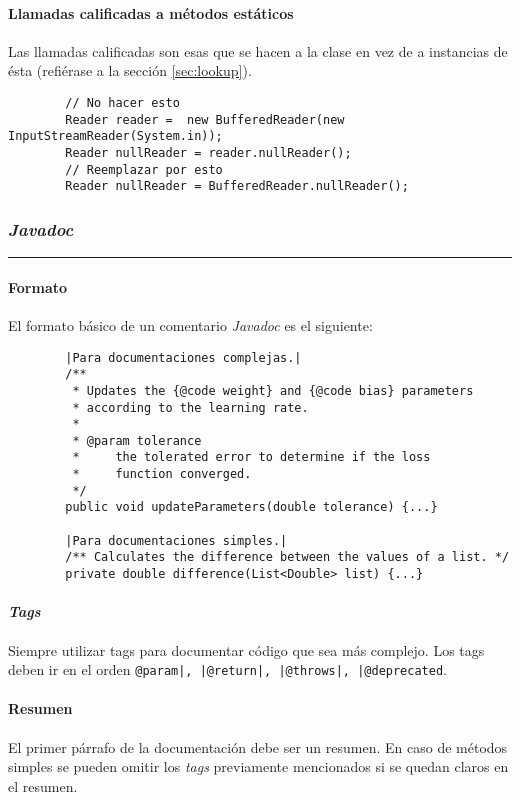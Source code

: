     \paragraph{Llamadas calificadas a métodos estáticos}
      Las llamadas calificadas son esas que se hacen a la clase en vez de a instancias de 
      ésta (refiérase a la sección \ref{sec:lookup}).

      \begin{verbatim}
        // No hacer esto
        Reader reader =  new BufferedReader(new InputStreamReader(System.in));
        Reader nullReader = reader.nullReader();
        // Reemplazar por esto
        Reader nullReader = BufferedReader.nullReader();         
      \end{verbatim}
  \subsubsection{\textit{Javadoc}}
    \vspace{-3ex}\rule{\linewidth}{1pt}

    \paragraph{Formato}
      El formato básico de un comentario \textit{Javadoc} es el siguiente:

      \begin{verbatim}
        |Para documentaciones complejas.|
        /**
         * Updates the {@code weight} and {@code bias} parameters
         * according to the learning rate.
         *
         * @param tolerance
         *     the tolerated error to determine if the loss
         *     function converged.
         */
        public void updateParameters(double tolerance) {...}

        |Para documentaciones simples.|
        /** Calculates the difference between the values of a list. */
        private double difference(List<Double> list) {...}
      \end{verbatim}
    \paragraph{\textit{Tags}}
      Siempre utilizar tags para documentar código que sea más complejo.
      Los tags deben ir en el orden 
      \texttt{@param|, |@return|, |@throws|, |@deprecated}.
    \paragraph{Resumen}
      El primer párrafo de la documentación debe ser un resumen.
      En caso de métodos simples se pueden omitir los \textit{tags} previamente 
      mencionados si se quedan claros en el resumen.
